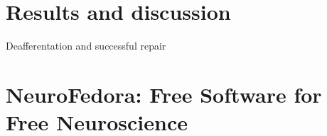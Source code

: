 \section{Results and discussion}
\begin{frame}[c]{Deafferentation and successful repair}
  \begin{figure}
      \centering
      \resizebox{\textwidth}{!}{}%
  \end{figure}
\end{frame}
\section{NeuroFedora: Free Software for Free Neuroscience}
